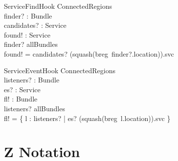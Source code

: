 \documentclass[a4paper,9pt]{article}
\begin{document}
\begin{schema}{ServiceFindHook}
  \Xi ConnectedRegions \\
  finder? : Bundle \\
  candidates? : \power Service \\
  found! : \power Service \\
\where
  finder? \in allBundles \\
  found! = candidates? \cap (squash(breg~finder?.location)).svc \\
\end{schema}

\begin{schema}{ServiceEventHook}
  \Xi ConnectedRegions \\
  listeners? : \power Bundle \\
  es? : Service \\
  fl! : \power Bundle \\
\where
  listeners? \subseteq allBundles \\
  fl! = \{ l : listeners? | es? \in (squash(breg~l.location)).svc \} \\
\end{schema}

\newpage
\section{Z Notation}
\label{cha:znot}

\makeatletter %

\def\symtab{\setbox0=\vbox\bgroup \def\\{\cr}
        \halign\bgroup\strut$##$\hfil&\quad##\hfil\cr}
\def\endsymtab{\crcr\egroup\egroup
        \dimen0=\ht0 \divide\dimen0 by2 \advance\dimen0 by\ht\strutbox
        \splittopskip=\ht\strutbox \vbadness=10000
        \predisplaypenalty=0
        $$\halign{##\cr\hbox to\linewidth{%
                \valign{##\vfil\cr
                        \setbox1=\vsplit0 to\dimen0 \unvbox1\cr 
                        \noalign{\hfil}\unvbox0\cr
                        \noalign{\hfil}}}\cr 
                \noalign{\prevdepth=\dp\strutbox}}$$
        \global\@ignoretrue}

\makeatother 
\end{document}
